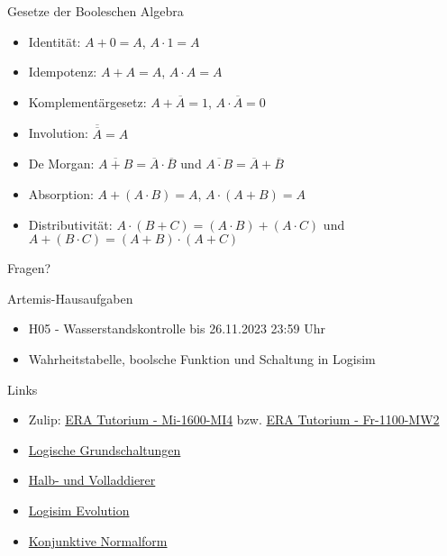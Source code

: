 \documentclass[
  german,            %
  aspectratio=169,    %
]{tumbeamer}
\begin{document}
\begin{frame}[c]{Gesetze der Booleschen Algebra}{}
  \begin{itemize}
    \item Identität: $A+0=A$, $A\cdot 1=A$
    \item Idempotenz: $A+A=A$, $A\cdot A=A$
    \item Komplementärgesetz: $A+\overline{A}=1$, $A\cdot\overline{A}=0$
    \item Involution: $\overline{\overline{A}}=A$
    \item De Morgan: $\overline{A+B}=\overline{A}\cdot\overline{B}$ und $\overline{A\cdot B}=\overline{A}+\overline{B}$
    \item Absorption: $A+(A\cdot B)=A$, $A\cdot(A+B)=A$
    \item Distributivität: $A\cdot(B+C)=(A\cdot B)+ (A\cdot C)$ und $A+(B\cdot C)=(A+B)\cdot (A+C)$
  \end{itemize}
\end{frame}

\begin{frame}[c]{}{}
  \begin{center}
    \LARGE Fragen?
  \end{center}
\end{frame}

\begin{frame}[c]{Artemis-Hausaufgaben}{}
  \begin{itemize}
    \item H05 - Wasserstandskontrolle bis 26.11.2023 23:59 Uhr
    \item Wahrheitstabelle, boolsche Funktion und Schaltung in Logisim
  \end{itemize}
\end{frame}

\begin{frame}[fragile, c]{Links}{}
  \begin{itemize}
    \item Zulip: \href{https://zulip.in.tum.de/#narrow/stream/1917-ERA-Tutorium---Mi-1600-MI4}{\glqq ERA Tutorium - Mi-1600-MI4\grqq}
          bzw. \href{https://zulip.in.tum.de/#narrow/stream/1940-ERA-Tutorium---Fr-1100-MW2}{\glqq ERA Tutorium - Fr-1100-MW2\grqq}
    \item \href{https://www.elektronik-kompendium.de/sites/dig/2609191.htm}{Logische Grundschaltungen}
    \item \href{https://www.elektronik-kompendium.de/sites/dig/0209031.htm}{Halb- und Volladdierer}
    \item \href{https://github.com/logisim-evolution/logisim-evolution/releases}{Logisim Evolution}
    \item \href{https://www.biancahoegel.de/logik/normalform_konjunktiv.html}{Konjunktive Normalform}
  \end{itemize}
\end{frame}

\maketitle
\end{document}
